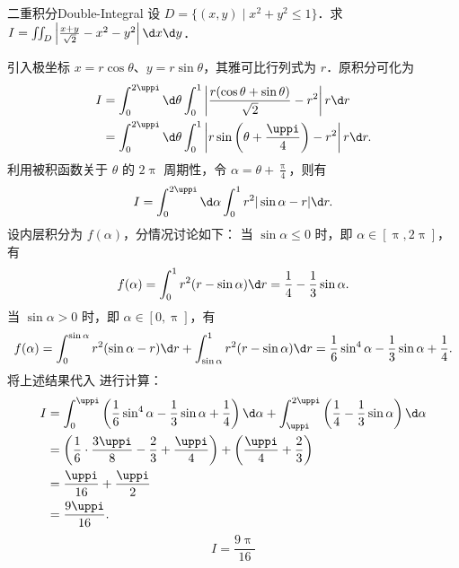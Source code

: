 \begin{problem}{二重积分}{Double-Integral}
    设 $D = \{(x, y) \mid x^2 + y^2 \le 1\}$．求 $I = \iint_D \left| \frac{x+y}{\sqrt{2}} - x^2 - y^2 \right| \d x \d y$．
\end{problem}

\begin{solution}
    引入极坐标 $x = r \cos \theta$、$y = r \sin \theta$，其雅可比行列式为 $r$．原积分可化为
    \begin{equation}
        \begin{aligned}
            I & = \int_0^{2\uppi} \d \theta \int_0^1 \left| \frac{r(\cos \theta + \sin \theta)}{\sqrt{2}} - r^2 \right| r \d r   \\
              & = \int_0^{2\uppi} \d \theta \int_0^1 \left| r \sin \left( \theta + \frac{\uppi}{4} \right) - r^2 \right| r \d r.
        \end{aligned}
    \end{equation}
    利用被积函数关于 $\theta$ 的 $2\uppi$ 周期性，令 $\alpha = \theta + \frac{\uppi}{4}$，则有
    \begin{equation}
        I = \int_0^{2\uppi} \d \alpha \int_0^1 r^2 |\sin \alpha - r| \d r. \label{eq:Integral-Form-2}
    \end{equation}
    设内层积分为 $f(\alpha)$，分情况讨论如下：
    当 $\sin \alpha \le 0$ 时，即 $\alpha \in [\uppi, 2\uppi]$，有
    \begin{equation}
        f(\alpha) = \int_0^1 r^2 (r - \sin \alpha) \d r = \frac{1}{4} - \frac{1}{3} \sin \alpha.
    \end{equation}
    当 $\sin \alpha > 0$ 时，即 $\alpha \in [0, \uppi]$，有
    \begin{equation}
        f(\alpha) = \int_0^{\sin \alpha} r^2 (\sin \alpha - r) \d r + \int_{\sin \alpha}^1 r^2 (r - \sin \alpha) \d r = \frac{1}{6} \sin^4 \alpha - \frac{1}{3} \sin \alpha + \frac{1}{4}.
    \end{equation}
    将上述结果代入  进行计算：
    \begin{equation}
        \begin{aligned}
            I & = \int_0^{\uppi} \left( \frac{1}{6} \sin^4 \alpha - \frac{1}{3} \sin \alpha + \frac{1}{4} \right) \d \alpha + \int_{\uppi}^{2\uppi} \left( \frac{1}{4} - \frac{1}{3} \sin \alpha \right) \d \alpha \\
              & = \left( \frac{1}{6} \cdot \frac{3\uppi}{8} - \frac{2}{3} + \frac{\uppi}{4} \right) + \left( \frac{\uppi}{4} + \frac{2}{3} \right)                                                                 \\
              & = \frac{\uppi}{16} + \frac{\uppi}{2}                                                                                                                                                               \\
              & = \frac{9\uppi}{16}.
        \end{aligned}
    \end{equation}
    \begin{equation}
        \boxed{I = \frac{9\uppi}{16}}
    \end{equation}
\end{solution}

